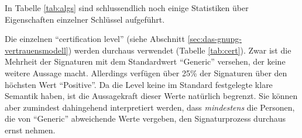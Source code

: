 \begin{table}[ht!]
  \footnotesize
  \centering
  \quad
  \quad
  \caption{Verwendung von Hashalgorithmen 
    , Public-Key-Algorithmen  und
    certification levels  in der grössten starken
    Zusammenhangskomponente}
\end{table}

In Tabelle \ref{tab:algs} sind schlussendlich noch einige Statistiken
über Eigenschaften einzelner Schlüssel aufgeführt. 

Die einzelnen ``certification level'' (siehe Abschnitt
\ref{sec:das-gnupg-vertrauensmodell}) werden durchaus verwendet
(Tabelle \ref{tab:cert}). Zwar ist die Mehrheit der Signaturen mit
dem Standardwert ``Generic'' versehen, der keine weitere Aussage
macht. Allerdings verfügen über 25\% der Signaturen über den
höchsten Wert ``Positive''. Da die Level keine im Standard
festgelegte klare Semantik haben, ist die Aussagekraft dieser Werte
natürlich begrenzt. Sie können aber zumindest dahingehend
interpretiert werden, dass \emph{mindestens} die Personen, die von
``Generic'' abweichende Werte vergeben, den Signaturprozess durchaus
ernst nehmen.

